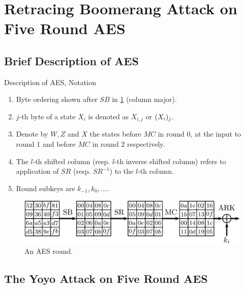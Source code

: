 \documentclass[notheorems]{beamer}
\theoremstyle{definition}
\theoremstyle{example}
\begin{document}
    \section{Retracing Boomerang Attack on Five Round AES}
    \label{sec:retr-boomerang-aes}

    \subsection{Brief Description of AES}
    \label{subsec:aes-description}
    \begin{frame}{Description of AES, Notation}
        \begin{enumerate}[<+->]
            \item Byte ordering shown after \(SB\) in \cref{fig:aes} (column
            major).
            \item \(j\)-th byte of a state \(X_i\) is denoted as \(X_{i,j}\) or
            \((X_i)_j\).
            \item Denote by \(W, Z\) and \(X\) the states before \(MC\) in round
            0, at the input to round 1 and before \(MC\) in round 2
            respectively.
            \item The \(l\)-th shifted column (resp. \(l\)-th inverse shifted
            column) refers to application of \(SR\) (resp. \(SR^{-1}\)) to the
            \(l\)-th column.
            \item Round subkeys are \(k_{-1}, k_0, \ldots\).
        \end{enumerate}
        \begin{figure}[!ht]
            \centering
            \includegraphics[width=0.9 \columnwidth]{images/aes.png}
            \caption{An AES round.}
            \label{fig:aes}
        \end{figure}
    \end{frame}

    \subsection{The Yoyo Attack on Five Round AES}
    \label{subsec:yoyo-aes}
\end{document}
